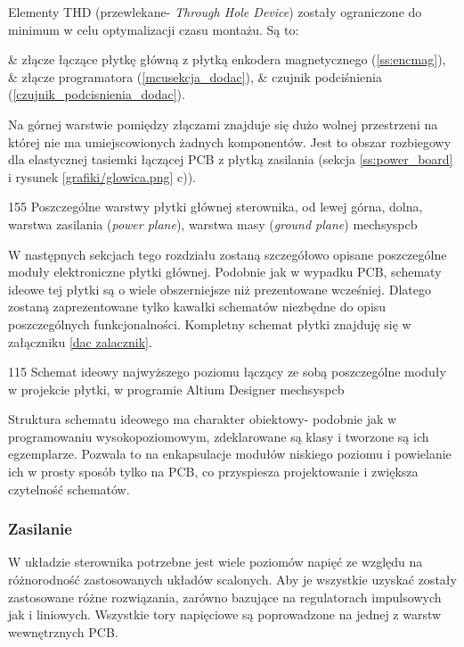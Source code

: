 Elementy THD (przewlekane- {\it Through Hole Device}) zostały ograniczone do minimum w celu optymalizacji czasu montażu. Są to:

\begin{easylist}
	& złącze łączące płytkę główną z płytką enkodera magnetycznego (\ref{ss:encmag}),
	& złącze programatora (\ref{mcusekcja_dodac}),
	& czujnik podciśnienia (\ref{czujnik_podcisnienia_dodac}).
	\\
\end{easylist}

Na górnej warstwie pomiędzy złączami znajduje się dużo wolnej przestrzeni na której nie ma umiejscowionych żadnych komponentów. Jest to obszar rozbiegowy dla elastycznej tasiemki łączącej PCB z płytką zasilania (sekcja \ref{ss:power_board} i rysunek \ref{grafiki/glowica.png} c)).

	{155}
	{Poszczególne warstwy płytki głównej sterownika, od lewej górna, dolna, warstwa zasilania ({\it power plane}), warstwa masy ({\it ground plane})}
	{mechsyspcb}

W następnych sekcjach tego rozdziału zostaną szczegółowo opisane poszczególne moduły elektroniczne płytki głównej. Podobnie jak w wypadku PCB, schematy ideowe tej płytki są o wiele obszerniejsze niż prezentowane wcześniej. Dlatego zostaną zaprezentowane tylko kawałki schematów niezbędne do opisu poszczególnych funkcjonalności. Kompletny schemat płytki znajduję się w załączniku \ref{dac zalacznik}. 

	{115}
	{Schemat ideowy najwyższego poziomu łączący ze sobą poszczególne moduły w projekcie płytki, w programie Altium Designer}
	{mechsyspcb}
	
Struktura schematu ideowego ma charakter obiektowy- podobnie jak w programowaniu wysokopoziomowym, zdeklarowane są klasy i tworzone są ich egzemplarze. Pozwala to na enkapsulacje modułów niskiego poziomu i powielanie ich w prosty sposób tylko na PCB, co przyspiesza projektowanie i zwiększa czytelność schematów.

\subsubsection{Zasilanie}

W układzie sterownika potrzebne jest wiele poziomów napięć ze względu na różnorodność zastosowanych układów scalonych. Aby je wszystkie uzyskać zostały zastosowane różne rozwiązania, zarówno bazujące na regulatorach impulsowych jak i liniowych. Wszystkie tory napięciowe są poprowadzone na jednej z warstw wewnętrznych PCB. \\

